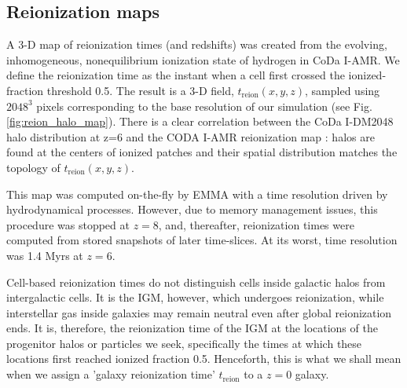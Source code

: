 \documentclass[twocolumn]{aastex61}
\newcommand{\dom}[1]{{#1}}
\begin{document}


\subsection{Reionization maps}
A 3-D map of reionization times (and redshifts) was created from the evolving, inhomogeneous, nonequilibrium ionization state of hydrogen in CoDa I-AMR.  We define the reionization time as the instant when a cell first crossed the ionized-fraction threshold 0.5.  
The result is a 3-D field, $t_\mathrm{reion}(x,y,z)$, sampled using $2048^3$ pixels corresponding to the base resolution of our simulation (see Fig. \ref{fig:reion_halo_map}). 
There is a clear correlation between the CoDa I-DM2048 halo distribution at z=6 and the CODA I-AMR reionization map : \dom{halos are found at the centers of ionized patches and their spatial distribution matches the topology of $t_\mathrm{reion}(x,y,z)$}.

This map was computed on-the-fly by EMMA with a time resolution driven by hydrodynamical processes. However, due to memory management issues, this procedure was stopped at $z = 8$, and, thereafter, reionization times were computed from stored snapshots of later time-slices. At its worst, time resolution was 1.4 Myrs at $z = 6$.

Cell-based reionization times do not distinguish cells inside galactic halos from intergalactic cells.  It is the IGM, however, which undergoes reionization, while interstellar gas inside galaxies may remain neutral even after global reionization ends.  It is, therefore, the reionization time of the IGM at the locations of the progenitor halos or particles we seek, specifically the times at which these locations first reached ionized fraction 0.5.  Henceforth, this is what we shall mean when we assign a 'galaxy reionization time' $t_\mathrm{reion}$ to a $z = 0$ galaxy. 


\end{document}
